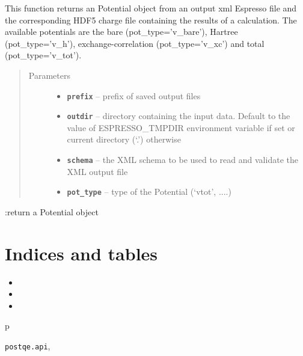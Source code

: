 \documentclass[letterpaper,10pt,english]{sphinxmanual}
\begin{document}
\begin{fulllineitems}
\label{postqe:postqe.api.get_potential}
This function returns an Potential object from an output xml Espresso file and
the corresponding HDF5 charge file containing the results of a calculation.
The available potentials are the bare (pot\_type='v\_bare'), Hartree (pot\_type='v\_h'),
exchange-correlation (pot\_type='v\_xc') and total (pot\_type='v\_tot').
\begin{quote}\begin{description}
\item[{Parameters}] \leavevmode\begin{itemize}
\item {} 
\textbf{\texttt{prefix}} -- prefix of saved output files

\item {} 
\textbf{\texttt{outdir}} -- directory containing the input data. Default to the value of     ESPRESSO\_TMPDIR environment variable if set or current directory (`.') otherwise

\item {} 
\textbf{\texttt{schema}} -- the XML schema to be used to read and validate the XML output file

\item {} 
\textbf{\texttt{pot\_type}} -- type of the Potential (`vtot', ....)

\end{itemize}

\end{description}\end{quote}

:return a Potential object

\end{fulllineitems}



\chapter{Indices and tables}
\label{index:indices-and-tables}\begin{itemize}
\item {} 

\item {} 

\item {} 

\end{itemize}


\renewcommand{\indexname}{Python Module Index}
\begin{theindex}
\def\bigletter#1{{\Large\sffamily#1}\nopagebreak\vspace{1mm}}
\bigletter{p}
\item {\texttt{postqe.api}}, \pageref{postqe:module-postqe.api}
\end{theindex}

\renewcommand{\indexname}{Index}
\printindex
\end{document}
